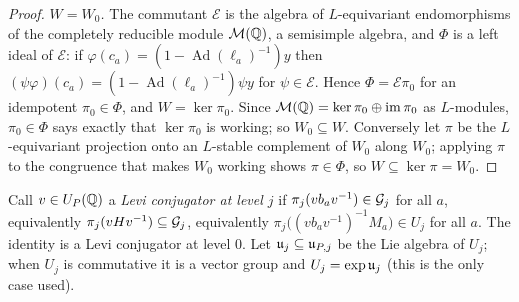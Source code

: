 \begin{proof}
\emph{$W=W_0$.} The commutant $\mathcal E$ is the algebra of $L$-equivariant endomorphisms of the
completely reducible module $\mathcal M(\mathbb{Q})$, a semisimple algebra, and $\Phi$ is a left ideal of
$\mathcal E$: if $\varphi(c_a)=(1-\operatorname{Ad}(\ell_a)^{-1})y$ then
$(\psi\varphi)(c_a)=(1-\operatorname{Ad}(\ell_a)^{-1})\psi y$ for $\psi\in\mathcal E$. Hence
$\Phi=\mathcal E\pi_0$ for an idempotent $\pi_0\in\Phi$, and $W=\ker\pi_0$. Since
$\mathcal M(\mathbb{Q})=\ker\pi_0\oplus\operatorname{im}\pi_0$ as $L$-modules, $\pi_0\in\Phi$ says exactly that
$\ker\pi_0$ is working; so $W_0\subseteq W$. Conversely let $\pi$ be the $L$-equivariant projection
onto an $L$-stable complement of $W_0$ along $W_0$; applying $\pi$ to the congruence that makes $W_0$
working shows $\pi\in\Phi$, so $W\subseteq\ker\pi=W_0$.
\end{proof}

Call $v\in U_P(\mathbb{Q})$ a \emph{Levi conjugator at level $j$} if $\pi_j(vb_av^{-1})\in\mathcal{G}_j$ for all $a$,
equivalently $\pi_j(vHv^{-1})\subseteq\mathcal{G}_j$, equivalently
$\pi_j\bigl((vb_av^{-1})^{-1}M_a\bigr)\in U_j$ for all $a$. The identity is a Levi conjugator at level
$0$. Let $\mathfrak{u}_j\subseteq\mathfrak{u}_{P,j}$ be the Lie algebra of $U_j$; when $U_j$ is commutative it is a vector
group and $U_j=\exp\mathfrak{u}_j$ (this is the only case used).

